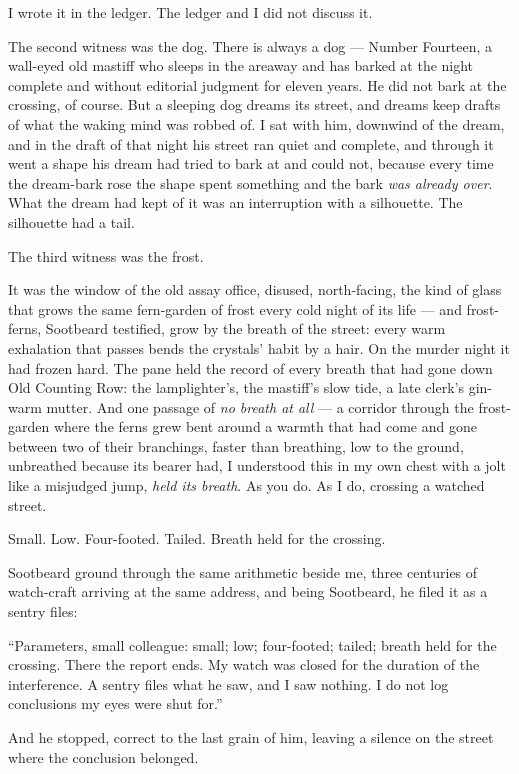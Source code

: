 I wrote it in the ledger. The ledger and I did not discuss it.

The second witness was the dog. There is always a dog --- Number Fourteen, a wall-eyed old mastiff who sleeps in the areaway and has barked at the night complete and without editorial judgment for eleven years. He did not bark at the crossing, of course. But a sleeping dog dreams its street, and dreams keep drafts of what the waking mind was robbed of. I sat with him, downwind of the dream, and in the draft of that night his street ran quiet and complete, and through it went a shape his dream had tried to bark at and could not, because every time the dream-bark rose the shape spent something and the bark \emph{was already over}. What the dream had kept of it was an interruption with a silhouette. The silhouette had a tail.

The third witness was the frost.

It was the window of the old assay office, disused, north-facing, the kind of glass that grows the same fern-garden of frost every cold night of its life --- and frost-ferns, Sootbeard testified, grow by the breath of the street: every warm exhalation that passes bends the crystals' habit by a hair. On the murder night it had frozen hard. The pane held the record of every breath that had gone down Old Counting Row: the lamplighter's, the mastiff's slow tide, a late clerk's gin-warm mutter. And one passage of \emph{no breath at all} --- a corridor through the frost-garden where the ferns grew bent around a warmth that had come and gone between two of their branchings, faster than breathing, low to the ground, unbreathed because its bearer had, I understood this in my own chest with a jolt like a misjudged jump, \emph{held its breath}. As you do. As I do, crossing a watched street.

Small. Low. Four-footed. Tailed. Breath held for the crossing.

Sootbeard ground through the same arithmetic beside me, three centuries of watch-craft arriving at the same address, and being Sootbeard, he filed it as a sentry files:

``Parameters, small colleague: small; low; four-footed; tailed; breath held for the crossing. There the report ends. My watch was closed for the duration of the interference. A sentry files what he saw, and I saw nothing. I do not log conclusions my eyes were shut for.''

And he stopped, correct to the last grain of him, leaving a silence on the street where the conclusion belonged.

